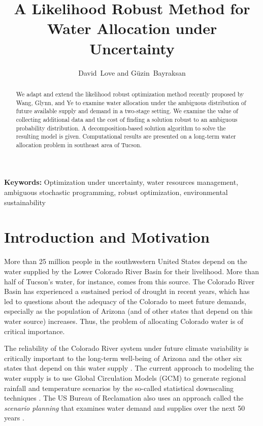 \documentclass[11pt]{article}
\author{David~Love and G\"{u}zin~Bayraksan}
\title{A Likelihood Robust Method for Water Allocation under Uncertainty}
\date{}
\newcommand{\keywords}[1]{\par\noindent\enspace\ignorespaces\textbf{Keywords:} #1}
\begin{document}
\maketitle

\begin{abstract}
	We adapt and extend the likelihood robust optimization method recently proposed by Wang, Glynn, and Ye to examine water allocation under the ambiguous distribution of future available supply and demand in a two-stage setting.
	We examine the value of collecting additional data and the cost of finding a solution robust to an ambiguous probability distribution.
	A decomposition-based solution algorithm to solve the resulting model is given.
	Computational results are presented on a long-term water allocation problem in southeast area of Tucson.
\end{abstract}

\keywords{Optimization under uncertainty, water resources management,  ambiguous stochastic programming, robust optimization, environmental sustainability}

\section{Introduction and Motivation}

More than 25 million people in the southwestern United States depend on the water supplied by the Lower Colorado River Basin for their livelihood.
More than half of Tucson's water, for instance, comes from this source.
The Colorado River Basin has experienced a sustained period of drought in recent years, which has led to questions about the adequacy of the Colorado to meet future demands, especially as the population of Arizona (and of other states that depend on this water source) increases.
Thus, the problem of allocating Colorado water is of critical importance. 
 
The reliability of the Colorado River system under future climate variability is critically important to the long-term well-being of Arizona and the other six states that depend on this water supply \cite{usbr_colorado_climate}. 
The current approach to modeling the water supply is to use Global Circulation Models (GCM) to generate regional rainfall and temperature scenarios by the so-called statistical downscaling techniques \cite{christensen_lettenmaier_07,dibike_caulibaly_05}.  
The US Bureau of Reclamation also uses an approach called the {\it scenario planning} that examines water demand and supplies over the next 50 years \cite{usbr_11}.
\end{document}

